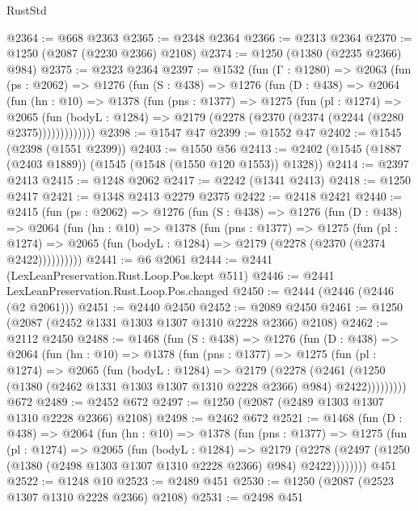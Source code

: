 \begin{lexlean}{RustStd}
\begin{coremodule}
{\begin{coremodule}
{{{{{{{{{{{{{@2364 := @668 @2363
@2365 := @2348 @2364
@2366 := @2313 @2364
@2370 := @1250 (@2087 (@2230 @2366) @2108)
@2374 := @1250 (@1380 (@2235 @2366) @984)
@2375 := @2323 @2364
@2397 := @1532
    (fun (Γ : @1280) =>
    @2063
      (fun (ps : @2062) =>
      @1276
        (fun (S : @438) =>
        @1276
          (fun (D : @438) =>
          @2064
            (fun (hn : @10) =>
            @1378
              (fun (pns : @1377) =>
              @1275
                (fun (pl : @1274) =>
                @2065
                  (fun (bodyL : @1284) =>
                  @2179 (@2278 (@2370 (@2374 (@2244 (@2280 @2375)))))))))))))
@2398 := @1547 @47
@2399 := @1552 @47
@2402 := @1545 (@2398 (@1551 @2399))
@2403 := @1550 @56
@2413 := @2402 (@1545 (@1887 (@2403 @1889)) (@1545 (@1548 (@1550 @120 @1553)) @1328))
@2414 := @2397 @2413
@2415 := @1248 @2062
@2417 := @2242 (@1341 @2413)
@2418 := @1250 @2417
@2421 := @1348 @2413 @2279 @2375
@2422 := @2418 @2421
@2440 := @2415
    (fun (ps : @2062) =>
    @1276
      (fun (S : @438) =>
      @1276
        (fun (D : @438) =>
        @2064
          (fun (hn : @10) =>
          @1378
            (fun (pns : @1377) =>
            @1275
              (fun (pl : @1274) =>
              @2065 (fun (bodyL : @1284) => @2179 (@2278 (@2370 (@2374 @2422))))))))))
@2441 := @6 @2061
@2444 := @2441 (LexLeanPreservation.Rust.Loop.Pos.kept @511)
@2446 := @2441 LexLeanPreservation.Rust.Loop.Pos.changed
@2450 := @2444 (@2446 (@2446 (@2 @2061)))
@2451 := @2440 @2450
@2452 := @2089 @2450
@2461 := @1250 (@2087 (@2452 @1331 @1303 @1307 @1310 @2228 @2366) @2108)
@2462 := @2112 @2450
@2488 := @1468
    (fun (S : @438) =>
    @1276
      (fun (D : @438) =>
      @2064
        (fun (hn : @10) =>
        @1378
          (fun (pns : @1377) =>
          @1275
            (fun (pl : @1274) =>
            @2065
              (fun (bodyL : @1284) =>
              @2179
                (@2278
                  (@2461
                    (@1250 (@1380 (@2462 @1331 @1303 @1307 @1310 @2228 @2366) @984) @2422)))))))))
    @672
@2489 := @2452 @672
@2497 := @1250 (@2087 (@2489 @1303 @1307 @1310 @2228 @2366) @2108)
@2498 := @2462 @672
@2521 := @1468
    (fun (D : @438) =>
    @2064
      (fun (hn : @10) =>
      @1378
        (fun (pns : @1377) =>
        @1275
          (fun (pl : @1274) =>
          @2065
            (fun (bodyL : @1284) =>
            @2179
              (@2278 (@2497 (@1250 (@1380 (@2498 @1303 @1307 @1310 @2228 @2366) @984) @2422))))))))
    @451
@2522 := @1248 @10
@2523 := @2489 @451
@2530 := @1250 (@2087 (@2523 @1307 @1310 @2228 @2366) @2108)
@2531 := @2498 @451
}}}}}}}}}}}}}
\end{coremodule}}
\end{coremodule}
\end{lexlean}
